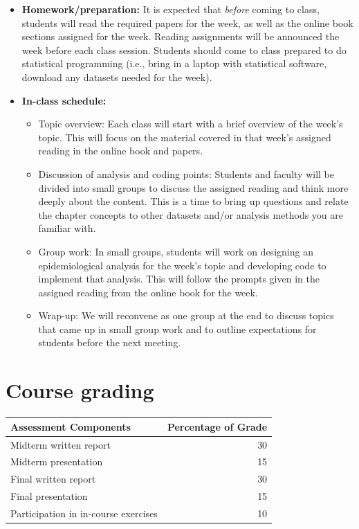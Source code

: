 \documentclass[
]{book}
\providecommand{\tightlist}{%
  \setlength{\itemsep}{0pt}\setlength{\parskip}{0pt}}
\begin{document}
\begin{itemize}
\tightlist
\item
  \textbf{Homework/preparation:}
  It is expected that \emph{before} coming to class, students will read the required
  papers for the week, as well as the online book sections assigned for the week.
  Reading assignments will be announced the week before each class session.
  Students should come to class prepared to do statistical programming (i.e.,
  bring in a laptop with statistical software, download any datasets needed for
  the week).
\item
  \textbf{In-class schedule:}

  \begin{itemize}
  \tightlist
  \item
    Topic overview: Each class will start with a brief overview of the week's
    topic. This will focus on the material covered in that week's assigned
    reading in the online book and papers.
  \item
    Discussion of analysis and coding points: Students and faculty will be
    divided into small groups to discuss the assigned reading and think more deeply about
    the content. This is a time to bring up questions and relate the chapter
    concepts to other datasets and/or analysis methods you are familiar with.
  \item
    Group work: In small groups, students will work on designing an
    epidemiological analysis for the week's topic and developing code to
    implement that analysis. This will follow the prompts given in the assigned
    reading from the online book for the week.
  \item
    Wrap-up: We will reconvene as one group at the end to discuss topics that
    came up in small group work and to outline expectations for students before
    the next meeting.
  \end{itemize}
\end{itemize}

\section{Course grading}\label{course-grading}

\begin{tabular}{l|r}
\hline
Assessment Components & Percentage of Grade\\
\hline
Midterm written report & 30\\
\hline
Midterm presentation & 15\\
\hline
Final written report & 30\\
\hline
Final presentation & 15\\
\hline
Participation in in-course exercises & 10\\
\hline
\end{tabular}
\end{document}
